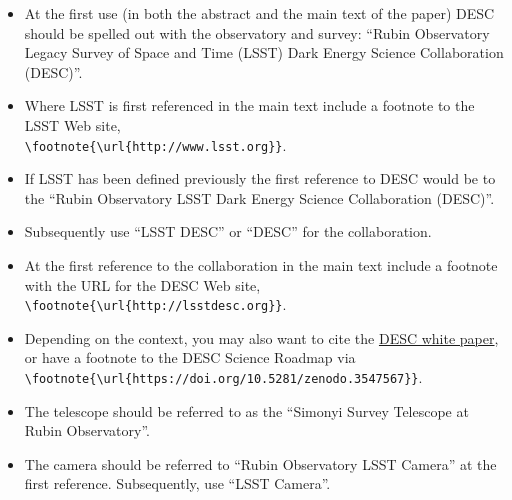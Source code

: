 \documentclass[letterpaper,11pt]{article}
\begin{document}
\begin{itemize}
\item{At the first use (in both the abstract and the main text of the paper) DESC should be spelled out with the observatory and survey:  ``Rubin Observatory Legacy Survey of Space and Time (LSST) Dark Energy Science Collaboration (DESC)''.}

\item{Where LSST is first referenced in the main text include a footnote to the LSST Web site,\\ \verb|\footnote{\url{http://www.lsst.org}}|.}

\item{If LSST has been defined previously the first reference to DESC would be to the ``Rubin Observatory LSST Dark Energy Science Collaboration (DESC)''.}

\item{Subsequently use ``LSST DESC'' or ``DESC'' for the collaboration.}

\item{At the first reference to the collaboration in the main text include a footnote with the URL for the DESC Web site, \verb|\footnote{\url{http://lsstdesc.org}}|.}

\item{Depending on the context, you may also want to cite the \href{http://adsabs.harvard.edu/abs/2012arXiv1211.0310L}{DESC white paper}, or have a footnote to the DESC Science Roadmap via \\\verb|\footnote{\url{https://doi.org/10.5281/zenodo.3547567}}|}. %

\item{The telescope should be referred to as the ``Simonyi Survey Telescope at Rubin Observatory''.}

\item{The camera should be referred to ``Rubin Observatory LSST Camera'' at the first reference.  Subsequently, use ``LSST Camera''.}

\end{itemize}

\end{document}
